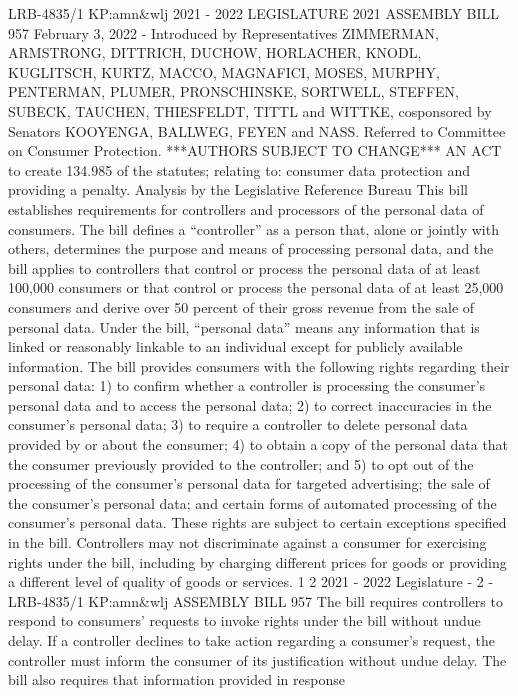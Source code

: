 LRB-4835/1
KP:amn&wlj
2021 - 2022 LEGISLATURE
2021 ASSEMBLY BILL 957
February 3, 2022 - Introduced by Representatives ZIMMERMAN, ARMSTRONG,
DITTRICH, DUCHOW, HORLACHER, KNODL, KUGLITSCH, KURTZ, MACCO,
MAGNAFICI, MOSES, MURPHY, PENTERMAN, PLUMER, PRONSCHINSKE, SORTWELL,
STEFFEN, SUBECK, TAUCHEN, THIESFELDT, TITTL and WITTKE, cosponsored by
Senators KOOYENGA, BALLWEG, FEYEN and NASS. Referred to Committee on
Consumer Protection.
***AUTHORS SUBJECT TO CHANGE***
AN ACT to create 134.985 of the statutes; relating to: consumer data protection
and providing a penalty.
Analysis by the Legislative Reference Bureau
This bill establishes requirements for controllers and processors of the personal
data of consumers. The bill defines a “controller” as a person that, alone or jointly
with others, determines the purpose and means of processing personal data, and the
bill applies to controllers that control or process the personal data of at least 100,000
consumers or that control or process the personal data of at least 25,000 consumers
and derive over 50 percent of their gross revenue from the sale of personal data.
Under the bill, “personal data” means any information that is linked or reasonably
linkable to an individual except for publicly available information.
The bill provides consumers with the following rights regarding their personal
data: 1) to confirm whether a controller is processing the consumer's personal data
and to access the personal data; 2) to correct inaccuracies in the consumer's personal
data; 3) to require a controller to delete personal data provided by or about the
consumer; 4) to obtain a copy of the personal data that the consumer previously
provided to the controller; and 5) to opt out of the processing of the consumer's
personal data for targeted advertising; the sale of the consumer's personal data; and
certain forms of automated processing of the consumer's personal data. These rights
are subject to certain exceptions specified in the bill. Controllers may not
discriminate against a consumer for exercising rights under the bill, including by
charging different prices for goods or providing a different level of quality of goods
or services.
1
2
2021 - 2022 Legislature - 2 - LRB-4835/1
KP:amn&wlj
 ASSEMBLY BILL 957
The bill requires controllers to respond to consumers' requests to invoke rights
under the bill without undue delay. If a controller declines to take action regarding
a consumer's request, the controller must inform the consumer of its justification
without undue delay. The bill also requires that information provided in response
